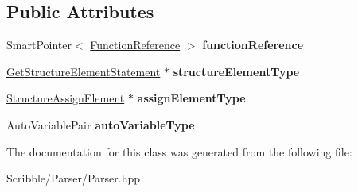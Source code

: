 \subsection*{Public Attributes}
\begin{DoxyCompactItemize}
\item 
\hypertarget{class_parser_reference_a02782ee92b1579659331761a2cfb7b5b}{Smart\-Pointer$<$ \hyperlink{class_function_reference}{Function\-Reference} $>$ {\bfseries function\-Reference}}\label{class_parser_reference_a02782ee92b1579659331761a2cfb7b5b}

\item 
\hypertarget{class_parser_reference_aec1d497310891ce8bb08bdf0f4f2058c}{\hyperlink{class_get_structure_element_statement}{Get\-Structure\-Element\-Statement} $\ast$ {\bfseries structure\-Element\-Type}}\label{class_parser_reference_aec1d497310891ce8bb08bdf0f4f2058c}

\item 
\hypertarget{class_parser_reference_ad8e71c22197d11c894917bd774ff8abe}{\hyperlink{class_structure_assign_element}{Structure\-Assign\-Element} $\ast$ {\bfseries assign\-Element\-Type}}\label{class_parser_reference_ad8e71c22197d11c894917bd774ff8abe}

\item 
\hypertarget{class_parser_reference_aaa636074609aaf99d1261ab555a496d9}{Auto\-Variable\-Pair {\bfseries auto\-Variable\-Type}}\label{class_parser_reference_aaa636074609aaf99d1261ab555a496d9}

\end{DoxyCompactItemize}


The documentation for this class was generated from the following file\-:\begin{DoxyCompactItemize}
\item 
Scribble/\-Parser/Parser.\-hpp\end{DoxyCompactItemize}

